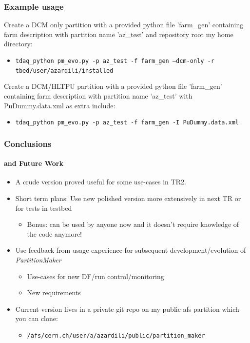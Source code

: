 \documentclass{beamer}
\begin{document}
\begin{frame}
  \frametitle{Example usage}
  Create a DCM only partition with a provided python file 'farm\_gen' containing farm
  description with partition name 'az\_test' and repository root my home directory:
  \begin{itemize}
    \item \texttt{tdaq\_python pm\_evo.py -p az\_test -f farm\_gen --dcm-only -r tbed/user/azardili/installed}

  \end{itemize}

    Create a DCM/HLTPU partition with a provided python file 'farm\_gen' containing farm
  description with partition name 'az\_test' with PuDummy.data.xml as extra include:
  \begin{itemize}
    \item \texttt{tdaq\_python pm\_evo.py -p az\_test -f farm\_gen -I PuDummy.data.xml}

  \end{itemize}
\end{frame}


\begin{frame}
  \frametitle{Conclusions}
  \framesubtitle{and Future Work}
  \begin{itemize}
    \item A crude version proved useful for some use-cases in TR2.

    \item Short term plans: Use new polished version more extensively
      in next TR or for tests in testbed
      \begin{itemize}
        \item Bonus: can be used by anyone now and it doesn't require knowledge of the
          code anymore!
      \end{itemize}

    \item Use feedback from usage experience for subsequent development/evolution of \textit{PartitionMaker}
     \begin{itemize}
       \item Use-cases for new DF/run control/monitoring

       \item New requirements

      \end{itemize}
     
    \item Current version lives in a private git repo on my public afs
      partition which you can clone:
      \begin{itemize}
        \item \texttt{/afs/cern.ch/user/a/azardili/public/partition\_maker}
      \end{itemize}
  \end{itemize}
\end{frame}
\end{document}
